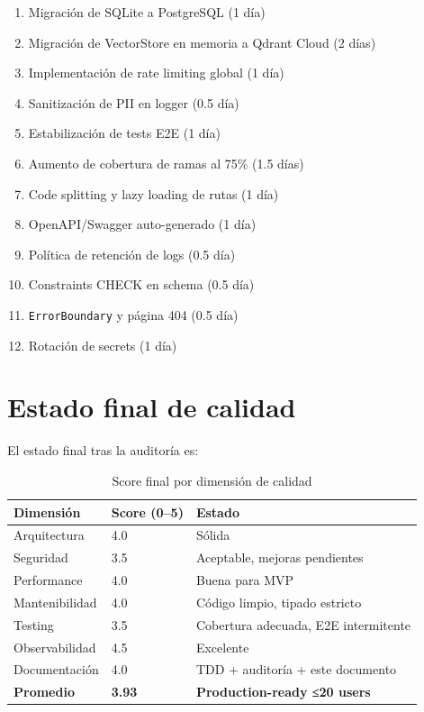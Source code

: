 \documentclass[10pt,a4paper,oneside]{report}
\begin{document}
\begin{enumerate}[leftmargin=1.6em]
\item Migración de SQLite a PostgreSQL (1 día)
\item Migración de VectorStore en memoria a Qdrant Cloud (2 días)
\item Implementación de rate limiting global (1 día)
\item Sanitización de PII en logger (0.5 día)
\item Estabilización de tests E2E (1 día)
\item Aumento de cobertura de ramas al 75\% (1.5 días)
\item Code splitting y lazy loading de rutas (1 día)
\item OpenAPI/Swagger auto-generado (1 día)
\item Política de retención de logs (0.5 día)
\item Constraints CHECK en schema (0.5 día)
\item \texttt{ErrorBoundary} y página 404 (0.5 día)
\item Rotación de secrets (1 día)
\end{enumerate}

\section{Estado final de calidad}
El estado final tras la auditoría es:

\begin{table}[H]
\centering
\begin{tabular}{p{4cm}p{4cm}p{4cm}}
\toprule
\textbf{Dimensión} & \textbf{Score (0--5)} & \textbf{Estado} \\
\midrule
Arquitectura & 4.0 & Sólida \\
Seguridad & 3.5 & Aceptable, mejoras pendientes \\
Performance & 4.0 & Buena para MVP \\
Mantenibilidad & 4.0 & Código limpio, tipado estricto \\
Testing & 3.5 & Cobertura adecuada, E2E intermitente \\
Observabilidad & 4.5 & Excelente \\
Documentación & 4.0 & TDD + auditoría + este documento \\
\midrule
\textbf{Promedio} & \textbf{3.93} & \textbf{Production-ready ≤20 users} \\
\bottomrule
\end{tabular}
\caption{Score final por dimensión de calidad}
\end{table}
\end{document}

